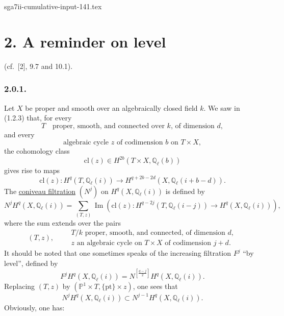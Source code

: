 \begin{filecontents*}{sga7ii-cumulative-input-141.tex}
\section*{2. A reminder on level}
\noindent(cf.~[2], 9.7 and 10.1).

\subsubsection*{2.0.1.}
Let $X$ be proper and smooth over an algebraically closed field $k$.  We saw
in (1.2.3) that, for every
\begin{equation}\tag{2.0.2}
T\quad\text{proper, smooth, and connected over $k$, of dimension $d$},
\end{equation}
and every
\begin{equation}\tag{2.0.3}
\text{algebraic cycle $z$ of codimension $b$ on $T\times X$},
\end{equation}
the cohomology class
\begin{equation}\tag{2.0.4}
\mathrm{cl}(z)\in H^{2b}(T\times X,\mathbb Q_\ell(b))
\end{equation}
gives rise to maps
\begin{equation}\tag{2.0.5}
\mathrm{cl}(z):H^q(T,\mathbb Q_\ell(i))\longrightarrow
H^{q+2b-2d}(X,\mathbb Q_\ell(i+b-d)).
\end{equation}
The \underline{coniveau filtration} $(N^j)$ on
$H^q(X,\mathbb Q_\ell(i))$ is defined by
\begin{equation}\tag{2.0.6}
N^jH^q(X,\mathbb Q_\ell(i))
=\sum_{(T,z)}\operatorname{Im}\!\left(
\mathrm{cl}(z):H^{q-2j}(T,\mathbb Q_\ell(i-j))
\longrightarrow H^q(X,\mathbb Q_\ell(i))\right),
\end{equation}
where the sum extends over the pairs
\begin{equation}\tag{2.0.7}
(T,z),\qquad
\begin{array}{l}
T/k\text{ proper, smooth, and connected, of dimension }d,\\
z\text{ an algebraic cycle on }T\times X\text{ of codimension }j+d.
\end{array}
\end{equation}
It should be noted that one sometimes speaks of the increasing filtration
$F^j$ ``by level'', defined by
\begin{equation}\tag{2.0.8}
F^jH^q(X,\mathbb Q_\ell(i))
=N^{\left[\frac{q-j}{2}\right]}H^q(X,\mathbb Q_\ell(i)).
\end{equation}
Replacing $(T,z)$ by $(\mathbb P^1\times T,\{\mathrm{pt}\}\times z)$, one
sees that
\begin{equation}\tag{2.0.9}
N^jH^q(X,\mathbb Q_\ell(i))
\subset N^{j-1}H^q(X,\mathbb Q_\ell(i)).
\end{equation}
Obviously, one has:


\end{filecontents*}
